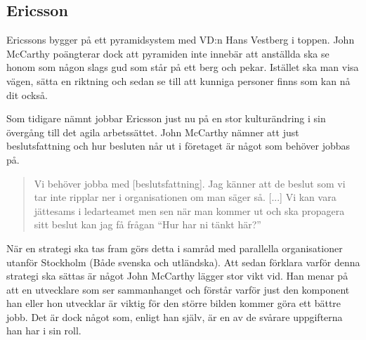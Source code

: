 \subsection{Ericsson}
Ericssons bygger på ett pyramidsystem med VD:n Hans Vestberg i toppen. John McCarthy poängterar dock att pyramiden inte innebär att anställda ska se honom som någon slags gud som står på ett berg och pekar. Istället ska man visa vägen, sätta en riktning och sedan se till att kunniga personer finns som kan nå dit också.

Som tidigare nämnt jobbar Ericsson just nu på en stor kulturändring i sin övergång till det agila arbetssättet. John McCarthy nämner att just beslutsfattning och hur besluten når ut i företaget är något som behöver jobbas på.

\begin{quote}
Vi behöver jobba med [beslutsfattning]. Jag känner att de beslut som vi tar inte ripplar ner i organisationen om man säger så. [...] Vi kan vara jättesams i ledarteamet men sen när man kommer ut och ska propagera sitt beslut kan jag få frågan ``Hur har ni tänkt här?''
\end{quote}

När en strategi ska tas fram görs detta i samråd med parallella organisationer utanför Stockholm (Både svenska och utländska). Att sedan förklara varför denna strategi ska sättas är något John McCarthy lägger stor vikt vid. Han menar på att en utvecklare som ser sammanhanget och förstår varför just den komponent han eller hon utvecklar är viktig för den större bilden kommer göra ett bättre jobb. Det är dock något som, enligt han själv, är en av de svårare uppgifterna han har i sin roll.